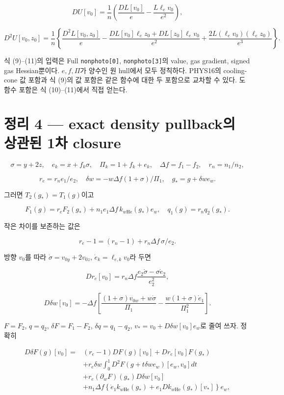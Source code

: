 \[
DU[v_0]=\frac1n\left(\frac{DL[v_0]}e-
\frac{L\ell_ev_0}{e^2}\right),
\]

\[
\boxed{D^2U[v_0,z_0]=\frac1n\left\{
\frac{D^2L[v_0,z_0]}e
-\frac{DL[v_0]\ell_ez_0+DL[z_0]\ell_ev_0}{e^2}
+\frac{2L(\ell_ev_0)(\ell_ez_0)}{e^3}
\right\}.}
\tag{11}
\]

식 (9)--(11)의 입력은 Full \texttt{nonphoto{[}0{]}}, \texttt{nonphoto{[}3{]}}의 value, gas gradient, signed gas Hessian뿐이다. \(e,f,\Pi\)가 양수인 원 hull에서 모두 정칙하다. PHYS16의 cooling-cone 값 포함과 식 (9)의 값 포함은 같은 함수에 대한 두 포함으로 교차할 수 있다. 도함수 포함은 식 (10)--(11)에서 직접 얻는다.

\hypertarget{uxc815uxb9ac-4-exact-density-pullbackuxc758-uxc0c1uxad00uxb41c-1uxcc28-closure}{%
\section{정리 4 --- exact density pullback의 상관된 1차 closure}\label{uxc815uxb9ac-4-exact-density-pullbackuxc758-uxc0c1uxad00uxb41c-1uxcc28-closure}}

\[
\sigma=y+2z,\quad e_k=x+f_k\sigma,\quad
\Pi_k=1+f_k+e_k,\quad \Delta f=f_1-f_2,\quad r_n=n_1/n_2,
\]

\[
r_e=r_ne_1/e_2,
\quad\delta w=-w\Delta f(1+\sigma)/\Pi_1,
\quad g_*=g+\delta w e_w.
\]

그러면 \(T_2(g_*)=T_1(g)\)이고

\[
F_1(g)=r_eF_2(g_*)+n_1e_1\Delta f\,k_{w\mathrm{He}}(g_*)e_w,
\quad q_1(g)=r_nq_2(g_*).
\tag{12}
\]

작은 차이를 보존하는 값은

\[
r_e-1=(r_n-1)+r_n\Delta f\,\sigma/e_2.
\]

방향 \(v_0\)를 따라 \(\dot\sigma=v_{0y}+2v_{0z}\), \(\dot e_k=\ell_{e,k}v_0\)라 두면

\[
\boxed{Dr_e[v_0]=r_n\Delta f
\frac{e_2\dot\sigma-\sigma\dot e_2}{e_2^2},}
\tag{13}
\]

\[
\boxed{D\delta w[v_0]=-
\Delta f\left[
\frac{(1+\sigma)v_{0w}+w\dot\sigma}{\Pi_1}
-\frac{w(1+\sigma)\dot e_1}{\Pi_1^2}
\right].}
\tag{14}
\]

\(F=F_2\), \(q=q_2\), \(\delta F=F_1-F_2\), \(\delta q=q_1-q_2\), \(v_*=v_0+D\delta w[v_0]e_w\)로 줄여 쓰자. 정확히

\[
\boxed{\begin{aligned}
D\delta F(g)[v_0]={}&(r_e-1)DF(g)[v_0]+Dr_e[v_0]F(g_*)\\
&+r_e\delta w\int_0^1D^2F(g+t\delta w e_w)[e_w,v_0]dt\\
&+r_e(\partial_wF)(g_*)D\delta w[v_0]\\
&+n_1\Delta f\left\{
\dot e_1 k_{w\mathrm{He}}(g_*)
+e_1Dk_{w\mathrm{He}}(g_*)[v_*]
\right\}e_w,
\end{aligned}}
\tag{15}
\]

